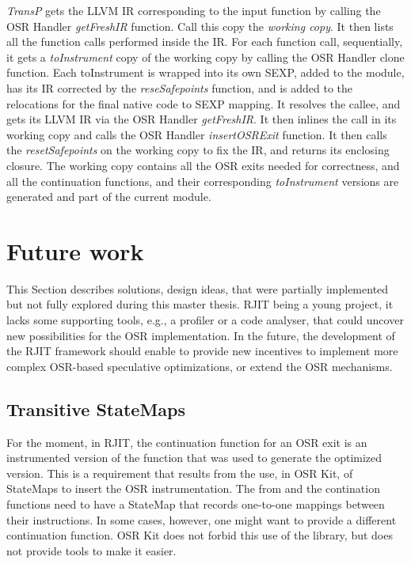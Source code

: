 \textit{TransP} gets the LLVM IR corresponding to the input function by calling the OSR Handler \textit{getFreshIR} function.
Call this copy the \textit{working copy}.
It then lists all the function calls performed inside the IR.
For each function call, sequentially, it gets a \textit{toInstrument} copy of the working copy by calling the OSR Handler clone function.
Each toInstrument is wrapped into its own SEXP, added to the module, has its IR corrected by the \textit{reseSafepoints} function, and is added to the relocations for the final native code to SEXP mapping.
It resolves the callee, and gets its LLVM IR via the OSR Handler \textit{getFreshIR}.
It then inlines the call in its working copy and calls the OSR Handler \textit{insertOSRExit} function.
It then calls the \textit{resetSafepoints} on the working copy to fix the IR, and returns its enclosing closure.
The working copy contains all the OSR exits needed for correctness, and all the continuation functions, and their corresponding \textit{toInstrument} versions are generated and part of the current module.\\


\section{Future work}
This Section describes solutions, design ideas, that were partially implemented but not fully explored during this master thesis.
RJIT being a young project, it lacks some supporting tools, e.g., a profiler or a code analyser, that could uncover new possibilities for the OSR implementation.
In the future, the development of the RJIT framework should enable to provide new incentives to implement more complex OSR-based speculative optimizations, or extend the OSR mechanisms.\\

\subsection{Transitive StateMaps}
For the moment, in RJIT, the continuation function for an OSR exit is an instrumented version of the function that was used to generate the optimized version.
This is a requirement that results from the use, in OSR Kit\cite{OSRKit}, of StateMaps to insert the OSR instrumentation.
The from and the contination functions need to have a StateMap that records one-to-one mappings between their instructions.
In some cases, however, one might want to provide a different continuation function.
OSR Kit does not forbid this use of the library, but does not provide tools to make it easier.\\  

